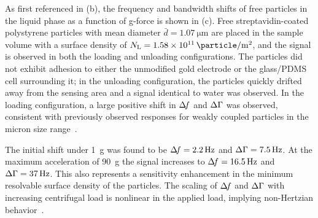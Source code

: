 As first referenced in (b), the frequency and bandwidth
shifts of free particles in the liquid phase as a function of g-force is shown
in (c).  Free streptavidin-coated polystyrene particles
with mean diameter $\bar{d}=\SI{1.07}{\micro\meter}$ are placed in the sample
volume with a surface density of
$N_\mathrm{L}=\SI{1.58e11}{\particle\per\meter\squared}$, and the signal is
observed in both the loading and unloading configurations.  The particles did
not exhibit adhesion to either the unmodified gold electrode or the glass/PDMS
cell surrounding it; in the unloading configuration, the particles quickly
drifted away from the sensing area and a signal identical to water was
observed.  In the loading configuration, a large positive shift in $\Delta\!f$ and
$\Delta\Gamma$ was observed, consistent with previously observed responses for weakly
coupled particles in the micron size range~\cite{johannsman2007contacts}.


The initial shift under \SI{1}{g} was found to be $\Delta\!f= \SI{2.2}{\hertz}$ and
$\Delta\Gamma=\SI{7.5}{\hertz}$.  At the maximum acceleration of \SI{90}{g} the signal
increases to $\Delta\!f = \SI{16.5}{\hertz}$ and $\Delta\Gamma=\SI{37}{\hertz}$.  This also
represents a sensitivity enhancement in the minimum resolvable surface density
of the particles.  The scaling of $\Delta\!f$ and $\Delta\Gamma$ with increasing centrifugal
load is nonlinear in the applied load, implying non-Hertzian
behavior~\cite{borovsky2001measuring}.

